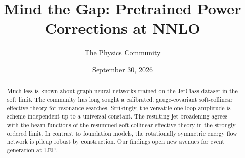 \documentclass[11pt]{article}
\title{Mind the Gap: Pretrained Power Corrections at NNLO}
\author{The Physics Community}
\date{September 30, 2026}
\numberwithin{equation}{section}
\theoremstyle{definition}
\theoremstyle{remark}
\begin{document}
\maketitle
\begin{abstract}
Much less is known about graph neural networks trained on the JetClass
dataset in the soft limit. The community has long sought a calibrated,
gauge-covariant soft-collinear effective theory for resonance searches.
Strikingly, the versatile one-loop amplitude is scheme independent up to
a universal constant. The resulting jet broadening agrees with the beam
functions of the resummed soft-collinear effective theory in the
strongly ordered limit. In contrast to foundation models, the
rotationally symmetric energy flow network is pileup robust by
construction. Our findings open new avenues for event generation at LEP.
\end{abstract}
\tableofcontents



\nocite{*}


\end{document}
